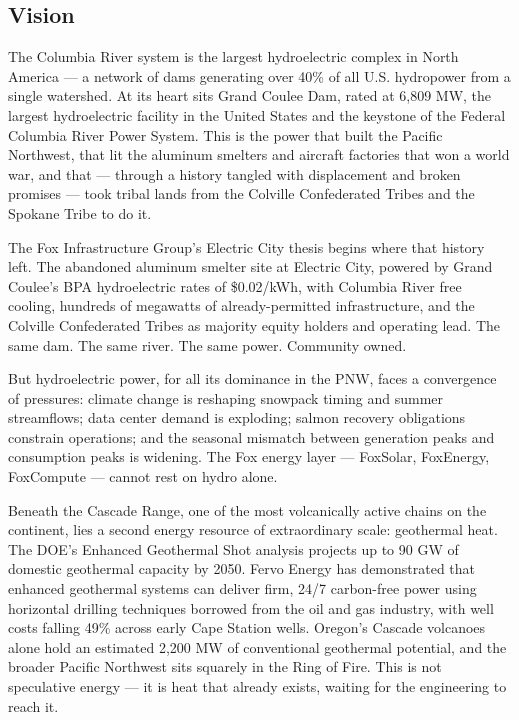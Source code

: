\documentclass[11pt,letterpaper]{article}
\begin{document}
\subsection{Vision}

The Columbia River system is the largest hydroelectric complex in North America --- a network of dams generating over 40\% of all U.S. hydropower from a single watershed. At its heart sits Grand Coulee Dam, rated at 6,809 MW, the largest hydroelectric facility in the United States and the keystone of the Federal Columbia River Power System. This is the power that built the Pacific Northwest, that lit the aluminum smelters and aircraft factories that won a world war, and that --- through a history tangled with displacement and broken promises --- took tribal lands from the Colville Confederated Tribes and the Spokane Tribe to do it.

The Fox Infrastructure Group's Electric City thesis begins where that history left. The abandoned aluminum smelter site at Electric City, powered by Grand Coulee's BPA hydroelectric rates of \$0.02/kWh, with Columbia River free cooling, hundreds of megawatts of already-permitted infrastructure, and the Colville Confederated Tribes as majority equity holders and operating lead. The same dam. The same river. The same power. Community owned.

But hydroelectric power, for all its dominance in the PNW, faces a convergence of pressures: climate change is reshaping snowpack timing and summer streamflows; data center demand is exploding; salmon recovery obligations constrain operations; and the seasonal mismatch between generation peaks and consumption peaks is widening. The Fox energy layer --- FoxSolar, FoxEnergy, FoxCompute --- cannot rest on hydro alone.

Beneath the Cascade Range, one of the most volcanically active chains on the continent, lies a second energy resource of extraordinary scale: geothermal heat. The DOE's Enhanced Geothermal Shot analysis projects up to 90 GW of domestic geothermal capacity by 2050. Fervo Energy has demonstrated that enhanced geothermal systems can deliver firm, 24/7 carbon-free power using horizontal drilling techniques borrowed from the oil and gas industry, with well costs falling 49\% across early Cape Station wells. Oregon's Cascade volcanoes alone hold an estimated 2,200 MW of conventional geothermal potential, and the broader Pacific Northwest sits squarely in the Ring of Fire. This is not speculative energy --- it is heat that already exists, waiting for the engineering to reach it.
\end{document}
